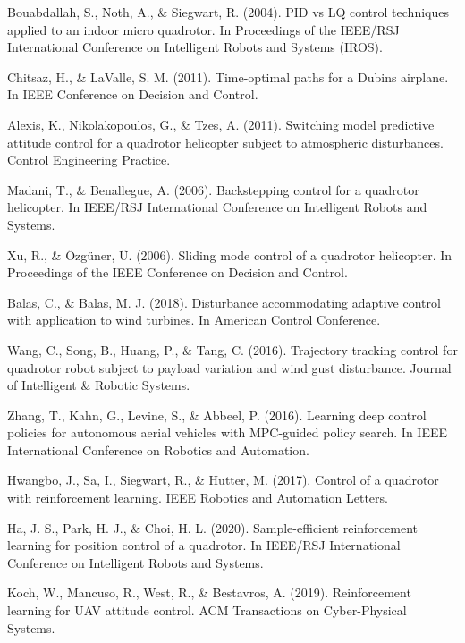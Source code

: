 \documentclass[12pt]{article}
\begin{document}

\begin{thebibliography}{10}

Bouabdallah, S., Noth, A., \& Siegwart, R. (2004). PID vs LQ control techniques applied to an indoor micro quadrotor. In Proceedings of the IEEE/RSJ International Conference on Intelligent Robots and Systems (IROS).

Chitsaz, H., \& LaValle, S. M. (2011). Time-optimal paths for a Dubins airplane. In IEEE Conference on Decision and Control.

Alexis, K., Nikolakopoulos, G., \& Tzes, A. (2011). Switching model predictive attitude control for a quadrotor helicopter subject to atmospheric disturbances. Control Engineering Practice.

Madani, T., \& Benallegue, A. (2006). Backstepping control for a quadrotor helicopter. In IEEE/RSJ International Conference on Intelligent Robots and Systems.

Xu, R., \& Özgüner, Ü. (2006). Sliding mode control of a quadrotor helicopter. In Proceedings of the IEEE Conference on Decision and Control.

Balas, C., \& Balas, M. J. (2018). Disturbance accommodating adaptive control with application to wind turbines. In American Control Conference.

Wang, C., Song, B., Huang, P., \& Tang, C. (2016). Trajectory tracking control for quadrotor robot subject to payload variation and wind gust disturbance. Journal of Intelligent \& Robotic Systems.

Zhang, T., Kahn, G., Levine, S., \& Abbeel, P. (2016). Learning deep control policies for autonomous aerial vehicles with MPC-guided policy search. In IEEE International Conference on Robotics and Automation.

Hwangbo, J., Sa, I., Siegwart, R., \& Hutter, M. (2017). Control of a quadrotor with reinforcement learning. IEEE Robotics and Automation Letters.

Ha, J. S., Park, H. J., \& Choi, H. L. (2020). Sample-efficient reinforcement learning for position control of a quadrotor. In IEEE/RSJ International Conference on Intelligent Robots and Systems.

Koch, W., Mancuso, R., West, R., \& Bestavros, A. (2019). Reinforcement learning for UAV attitude control. ACM Transactions on Cyber-Physical Systems.


\end{thebibliography}
\end{document}

